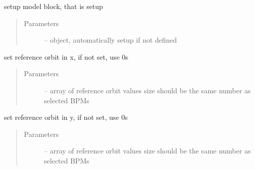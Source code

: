 \documentclass[letterpaper,10pt,english]{sphinxmanual}
\begin{document}
\begin{fulllineitems}
\begin{fulllineitems}
\begin{quote}
\begin{description}
\end{description}\end{quote}

\end{fulllineitems}


\begin{fulllineitems}
\label{\detokenize{src/apidocs/genopt:genopt.DakotaOC.set_model}}
setup model block, that is setup 
\begin{quote}\begin{description}
\item[{Parameters}] \leavevmode
{} --  object, automatically setup if not defined

\end{description}\end{quote}

\end{fulllineitems}


\begin{fulllineitems}
\label{\detokenize{src/apidocs/genopt:genopt.DakotaOC.set_ref_x0}}
set reference orbit in x, if not set, use 0s
\begin{quote}\begin{description}
\item[{Parameters}] \leavevmode
{} -- array of reference orbit values
size should be the same number as selected BPMs

\end{description}\end{quote}

\end{fulllineitems}


\begin{fulllineitems}
\label{\detokenize{src/apidocs/genopt:genopt.DakotaOC.set_ref_y0}}
set reference orbit in y, if not set, use 0s
\begin{quote}\begin{description}
\item[{Parameters}] \leavevmode
{} -- array of reference orbit values
size should be the same number as selected BPMs


\end{description}
\end{quote}
\end{fulllineitems}
\end{fulllineitems}
\end{document}
